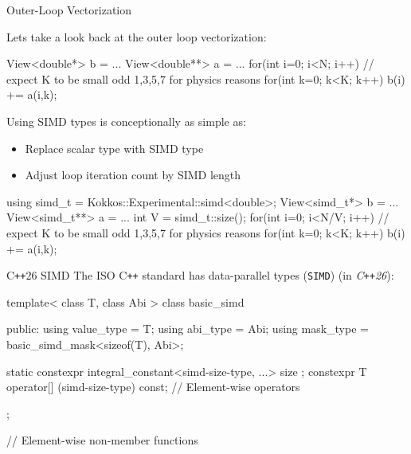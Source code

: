 \begin{frame}[fragile]{Outer-Loop Vectorization}

  Lets take a look back at the outer loop vectorization:
  \begin{code}[linebackgroundcolor={},keywords={for,int}]
  View<double*> b = ...
  View<double**> a = ...
  for(int i=0; i<N; i++) {
    // expect K to be small odd 1,3,5,7 for physics reasons
    for(int k=0; k<K; k++) b(i) += a(i,k);
  }
  \end{code}

  \pause
  Using SIMD types is conceptionally as simple as:
	\begin{itemize}
		\item Replace scalar type with SIMD type
		\item Adjust loop iteration count by SIMD length
	\end{itemize}

  \begin{code}[linebackgroundcolor={},keywords={for,int}]
  using simd_t = Kokkos::Experimental::simd<double>;
  View<simd_t*> b = ...
  View<simd_t**> a = ...
  int V = simd_t::size();
  for(int i=0; i<N/V; i++) {
    // expect K to be small odd 1,3,5,7 for physics reasons
    for(int k=0; k<K; k++) b(i) += a(i,k);
  }
  \end{code}
\end{frame}

\begin{frame}[fragile]{C\texttt{++}26 SIMD}
	The ISO C\texttt{++} standard has data-parallel types (\texttt{SIMD}) (in \emph{C\texttt{++}26}):

  \begin{code}[linebackgroundcolor={},keywords={template,class,public,using}]
template< class T, class Abi >
class basic_simd {
public:
  using value_type = T;
  using abi_type   = Abi;
  using mask_type  = basic_simd_mask<sizeof(T), Abi>;

  static constexpr integral_constant<simd-size-type, ...> size {};
  constexpr T operator[] (simd-size-type) const;
  // Element-wise operators
};

// Element-wise non-member functions

  \end{code}

\end{frame}

